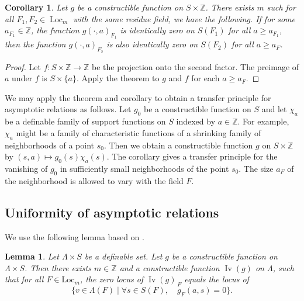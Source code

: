 \documentclass[12pt]{amsart}
\newcommand{\op}[1]{\operatorname{#1}}
\newcommand{\ring}[1]{{\mathbb #1}}
\newcommand{\locus}[1]{\op{Iv}(#1)}
\newcommand{\Loc}{\mathrm{Loc}}
\theoremstyle{plain}
\newtheorem{lem}[thm]{Lemma}
\newtheorem{cor}[thm]{Corollary}
\theoremstyle{definition}
\begin{document}
\begin{cor}\label{cor:12} Let $g$ be a constructible function on $S\times\ring{Z}$.
  There exists $m$ such for all $F_1,F_2\in\op{Loc}_m$ with the same
  residue field, we have the following.  If for some $a_{F_1}\in\ring{Z}$, the
  function $g(\cdot,a)_{F_1}$ is identically zero on $S(F_1)$ for all $a\ge
  a_{F_1}$, then the function $g(\cdot,a)_{F_2}$ is also identically zero
  on $S(F_2)$ for all $a\ge a_F$.
\end{cor}

\begin{proof} Let $f:S\times \ring{Z}\to\ring{Z}$ be the projection
  onto the second factor.  The preimage of $a$ under $f$ is
  $S\times\{a\}$.  Apply the theorem to $g$ and $f$ for each $a\ge
  a_F$.
\end{proof}

We may apply the theorem and corollary to obtain a transfer principle
for asymptotic relations as follows.  Let $g_0$ be a constructible
function on $S$ and let $\chi_a$ be a definable family of support
functions on $S$ indexed by $a\in\ring{Z}$.  For example, $\chi_a$ might
be a family of characteristic functions of a shrinking family of
neighborhoods of a point $s_0$.  Then we obtain a constructible
function $g$ on $S\times\ring{Z}$ by $(s,a)\mapsto g_0(s)\chi_a(s)$.
The corollary gives a transfer principle for the vanishing of $g_0$ in
sufficiently small neighborhoods of the point $s_0$.  The size $a_F$ of the
neighborhood is allowed to vary with the field $F$.

\subsection{Uniformity of asymptotic relations}

We use the following lemma based on \cite[Th 4.4.4]{CGH}.

\begin{lem}  
  Let $\Lambda\times S$ be a definable set.  Let $g$ be a
  constructible function on $\Lambda\times S$.  Then there exists
  $m\in\ring{Z}$ and a constructible function $\locus{g}$ on $\Lambda$,
  such that for all $F\in\Loc_m$, the zero locus of $\locus{g}_{\,F}$
  equals the locus of
\[
\{v\in \Lambda(F)\mid \forall s\in S(F),\quad g_F(a,s)=0\}.
\]
\end{lem}
\end{document}
